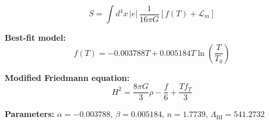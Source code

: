 
\begin{equation}
  S = \int d^4x \, |e| \, \frac{1}{16\pi G} \left[ f(T) + \mathcal{L}_m \right]
\end{equation}

\textbf{Best-fit model:}
\begin{equation}
  f(T) = -0.003788 T + 0.005184 T \ln\!\left(\frac{T}{T_0}\right)
\end{equation}

\textbf{Modified Friedmann equation:}
\begin{equation}
  H^2 = \frac{8\pi G}{3} \rho - \frac{f}{6} + \frac{T f_T}{3}
\end{equation}

\textbf{Parameters:}
$\alpha = -0.003788$, \quad
$\beta = 0.005184$, \quad
$n = 1.7739$, \quad
$\Lambda_{\text{BI}} = 541.2732$